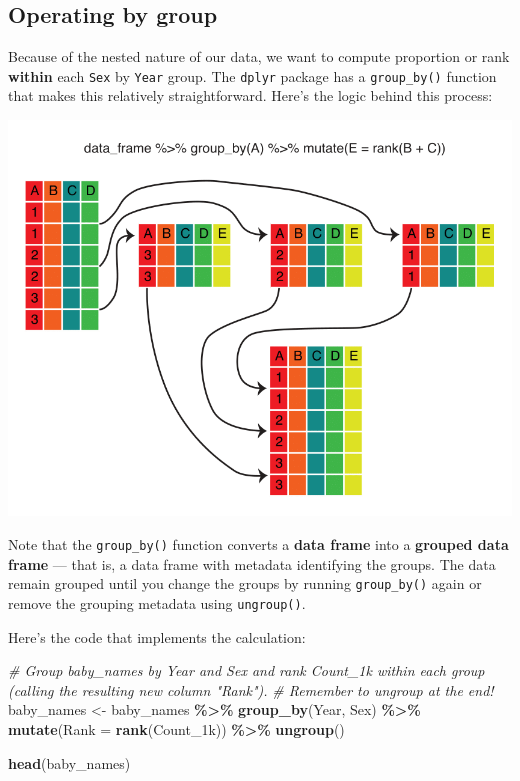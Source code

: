 \documentclass[
]{book}
\newenvironment{Shaded}{\begin{snugshade}}{\end{snugshade}}
\newcommand{\CommentTok}[1]{\textcolor[rgb]{0.56,0.35,0.01}{\textit{#1}}}
\newcommand{\DataTypeTok}[1]{\textcolor[rgb]{0.13,0.29,0.53}{#1}}
\newcommand{\KeywordTok}[1]{\textcolor[rgb]{0.13,0.29,0.53}{\textbf{#1}}}
\newcommand{\NormalTok}[1]{#1}
\newcommand{\OperatorTok}[1]{\textcolor[rgb]{0.81,0.36,0.00}{\textbf{#1}}}
\newcommand{\StringTok}[1]{\textcolor[rgb]{0.31,0.60,0.02}{#1}}
\begin{document}
\hypertarget{operating-by-group}{%
\subsection{Operating by group}\label{operating-by-group}}

Because of the nested nature of our data, we want to compute proportion or rank \textbf{within} each \texttt{Sex} by \texttt{Year} group. The \texttt{dplyr} package has a \texttt{group\_by()} function that makes this relatively straightforward. Here's the logic behind this process:

\includegraphics{R/Rintro/images/mutate_group_by.png}

Note that the \texttt{group\_by()} function converts a \textbf{data frame} into a \textbf{grouped data frame} --- that is, a data frame with metadata identifying the groups. The data remain grouped until you change the groups by running \texttt{group\_by()} again or remove the grouping metadata using \texttt{ungroup()}.

Here's the code that implements the calculation:

\begin{Shaded}
\begin{Highlighting}[]
\CommentTok{\# Group baby\_names by Year and Sex and rank Count\_1k within each group (calling the resulting new column "Rank"). }
\CommentTok{\# Remember to ungroup at the end!}
\NormalTok{baby\_names \textless{}{-}}
\StringTok{  }\NormalTok{baby\_names }\OperatorTok{\%\textgreater{}\%}
\StringTok{  }\KeywordTok{group\_by}\NormalTok{(Year, Sex) }\OperatorTok{\%\textgreater{}\%}
\StringTok{  }\KeywordTok{mutate}\NormalTok{(}\DataTypeTok{Rank =} \KeywordTok{rank}\NormalTok{(Count\_1k)) }\OperatorTok{\%\textgreater{}\%}
\StringTok{  }\KeywordTok{ungroup}\NormalTok{()}

\KeywordTok{head}\NormalTok{(baby\_names)}
\end{Highlighting}
\end{Shaded}
\end{document}
